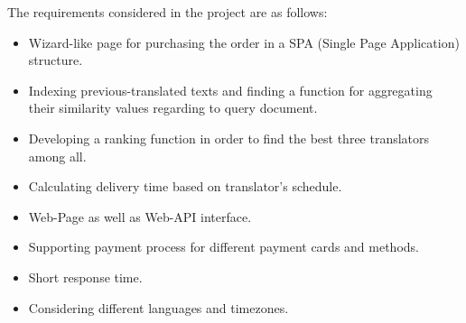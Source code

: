 The requirements considered in the project are as follows:
\begin{itemize}
	\item Wizard-like page for purchasing the order in a SPA (Single Page Application) structure.
	\item Indexing previous-translated texts and finding a function for aggregating their similarity values regarding to query document.
	\item Developing a ranking function in order to find the best three translators among all.
	\item Calculating delivery time based on translator's schedule.
	\item Web-Page as well as Web-API interface.
	\item Supporting payment process for different payment cards and methods.
	\item Short response time.
	\item Considering different languages and timezones.
\end{itemize}